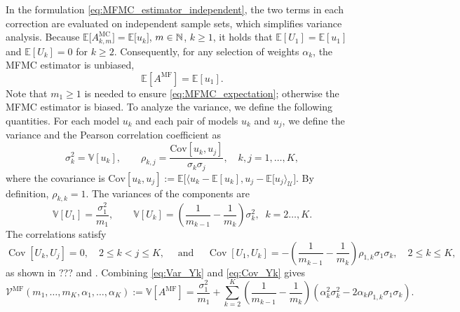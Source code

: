 In the formulation \eqref{eq:MFMC_estimator_independent}, 
the two terms in each correction are evaluated on independent sample sets, 
which simplifies variance analysis. 
%
Because $\mathbb{E}\big[ A^{\text{MC}}_{k,m} \big] = \mathbb{E}\big[ u_k\big]$, $m \in \mathbb{N}$, $k\ge 1$,
it holds that  $\mathbb{E}[U_1] =  \mathbb{E}[u_1]$ and  
$\mathbb{E}[U_k] = 0$ for $k\ge 2$.
Consequently, for any selection of weights $\alpha_k$, 
the MFMC estimator is  unbiased, 
\begin{equation}\label{eq:MFMC_expectation}
            \mathbb{E}[A^{\text{MF}}] =  \mathbb{E}[u_1].
\end{equation}
Note that $m_1 \ge 1$ is needed to ensure \eqref{eq:MFMC_expectation}; otherwise the MFMC estimator
is biased.
To analyze the variance, we define the following quantities.
For each model $u_k$  and each pair of models $u_k$ and $u_j$, 
we define the variance and the Pearson correlation coefficient as
\begin{equation*}
    \sigma_k^2 = \mathbb{V}\left[u_k\right],\qquad \rho_{k,j} 
                       = \frac{\text{Cov}\left[ u_k, u_j\right]}{\sigma_k\sigma_j}, \quad k,j=1,\dots, K,
\end{equation*}
where the covariance is 
$\text{Cov}[u_k, u_j] := \mathbb{E}\big[\langle u_k - \mathbb{E}[u_k], u_j - \mathbb{E}[u_j \rangle_{{\mathcal U}} \big]$.
By definition, $\rho_{k,k}=1$. 
The variances of the components are
\begin{equation}\label{eq:Var_Yk}
    \mathbb{V}[U_1] = \frac{\sigma_1^2}{m_1}, \qquad 
    \mathbb{V}[U_k] = \left(\frac{1}{m_{k-1}} - \frac{1}{m_k}\right)\sigma_k^2, \;\; k=2\ldots, K.
\end{equation}
The correlations satisfy
\begin{equation}\label{eq:Cov_Yk}
\operatorname{Cov} [U_k,U_j ]=0, \quad  2\le k<j\le K, 
\quad \mbox{ and } \quad
\operatorname{Cov}[U_1,U_k] = -\!\left(\frac{1}{m_{k-1}} - \frac{1}{m_k}\right)\rho_{1,k}\sigma_1\sigma_k,
\quad  2\le k \le K, 
\end{equation}
as shown in ??? and \cite[Lemma~3.2]{BPeherstorfer_KWillcox_MDGunzburger_2016a}. 
Combining \eqref{eq:Var_Yk} and \eqref{eq:Cov_Yk} gives
%
\begin{equation}\label{eq:MFMC_variance0}
    \mathcal{V}^{\text{MF}}(m_1, \ldots, m_K, \alpha_1, \ldots, \alpha_K)
    :=  \mathbb{V}[A^{\text{MF}}]
    =\frac{\sigma_1^2}{m_1} 
    + \sum_{k=2}^K \left(\frac{1}{m_{k-1}} - \frac{1}{m_k}\right)\!\left(\alpha_k^2\sigma_k^2 - 2\alpha_k\rho_{1,k}\sigma_1\sigma_k\right).
\end{equation}

